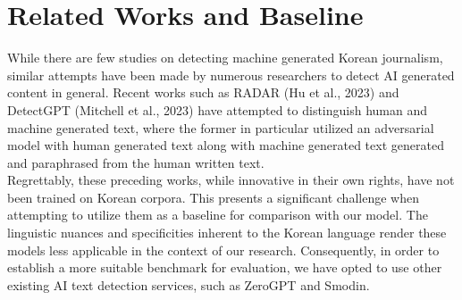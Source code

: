 \documentclass{article}
\begin{document}
\section{Related Works and Baseline}
\null\quad While there are few studies on detecting machine generated Korean journalism, similar attempts have been made by numerous researchers to detect AI generated content in general.
Recent works such as RADAR (Hu et al., 2023) and DetectGPT (Mitchell et al., 2023) have attempted to distinguish human and machine generated text,
where the former in particular utilized an adversarial model with human generated text along with machine generated text generated and paraphrased from the human written text. \\
\null\quad Regrettably, these preceding works, while innovative in their own rights, have not been trained on Korean corpora.
This presents a significant challenge when attempting to utilize them as a baseline for comparison with our model.
The linguistic nuances and specificities inherent to the Korean language render these models less applicable in the context of our research.
Consequently, in order to establish a more suitable benchmark for evaluation, we have opted to use other existing AI text detection services, such as ZeroGPT and Smodin.
\end{document}
